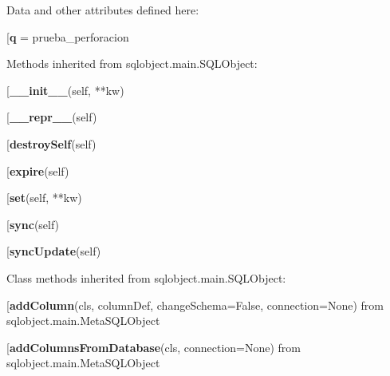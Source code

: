 Data and other attributes defined here:\\
\begin{description}\item[{\bf q} = prueba\_perforacion\end{description}


Methods inherited from sqlobject.main.SQLObject:\\
\begin{description}\item[{\bf \_\_init\_\_}(self, **kw)\end{description}

\begin{description}\item[{\bf \_\_repr\_\_}(self)\end{description}

\begin{description}\item[{\bf destroySelf}(self)\end{description}

\begin{description}\item[{\bf expire}(self)\end{description}

\begin{description}\item[{\bf set}(self, **kw)\end{description}

\begin{description}\item[{\bf sync}(self)\end{description}

\begin{description}\item[{\bf syncUpdate}(self)\end{description}


Class methods inherited from sqlobject.main.SQLObject:\\
\begin{description}\item[{\bf addColumn}(cls, columnDef, changeSchema=False, connection=None) from sqlobject.main.MetaSQLObject\end{description}

\begin{description}\item[{\bf addColumnsFromDatabase}(cls, connection=None) from sqlobject.main.MetaSQLObject\end{description}

